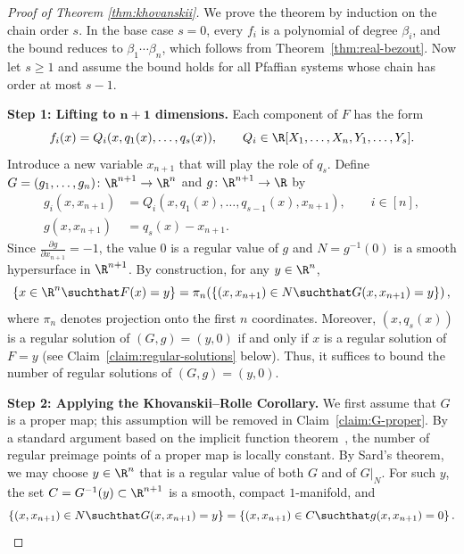 \begin{proof}[Proof of Theorem \ref{thm:khovanskii}]
We prove the theorem by induction on the chain order $s$. In the base case $s=0$, every $f_i$ is a polynomial of degree $\beta_i$, and the bound reduces to $\beta_1 \dotsm \beta_n$, which follows from Theorem~\ref{thm:real-bezout}. Now let $s \ge 1$ and assume the bound holds for all Pfaffian systems whose chain has order at most $s-1$.

\medskip
\noindent\textbf{Step 1: Lifting to $\boldsymbol{n+1}$ dimensions.}
Each component of $F$ has the form
\begin{equation*}
  f_i(x) = Q_i(x, q_1(x), \ldots, q_s(x)), \qquad Q_i \in \R[X_1, \ldots, X_n, Y_1, \ldots, Y_s].
\end{equation*}
Introduce a new variable $x_{n+1}$ that will play the role of $q_s$. Define $G = (g_1, \ldots, g_n)\colon \R^{n+1} \to \R^n$ and $g\colon \R^{n+1} \to \R$ by
\begin{align*}
  g_i(x, x_{n+1}) &= Q_i(x, q_1(x), \ldots, q_{s-1}(x), x_{n+1}), \qquad i \in [n], \\
  g(x, x_{n+1}) &= q_s(x) - x_{n+1}.
\end{align*}
Since $\frac{\partial g}{\partial x_{n+1}} = -1$, the value $0$ is a regular value of $g$ and $N = g^{-1}(0)$ is a smooth hypersurface in $\R^{n+1}$. By construction, for any $y \in \R^n$,
\begin{equation} \label{eqn:counting-in-n+1}
  \left\{x \in \R^n \suchthat F(x) = y\right\} = \pi_n\!\left(\left\{(x, x_{n+1}) \in N \suchthat G(x, x_{n+1}) = y\right\}\right),
\end{equation}
where $\pi_n$ denotes projection onto the first $n$ coordinates. Moreover, $(x, q_s(x))$ is a regular solution of $(G, g) = (y, 0)$ if and only if $x$ is a regular solution of $F = y$ (see Claim~\ref{claim:regular-solutions} below). Thus, it suffices to bound the number of regular solutions of $(G, g) = (y, 0)$.

\medskip
\noindent\textbf{Step 2: Applying the Khovanskii--Rolle Corollary.}
We first assume that $G$ is a proper map; this assumption will be removed in Claim~\ref{claim:G-proper}. By a standard argument based on the implicit function theorem~\cite[Chapter~1]{milnor1997topology}, the number of regular preimage points of a proper map is locally constant. By Sard's theorem, we may choose $y \in \R^n$ that is a regular value of both $G$ and of $G|_N$. For such $y$, the set $C = G^{-1}(y) \subset \R^{n+1}$ is a smooth, compact $1$-manifold, and
\begin{equation*}
  \left\{(x, x_{n+1}) \in N \suchthat G(x, x_{n+1}) = y\right\} = \left\{(x, x_{n+1}) \in C \suchthat g(x, x_{n+1}) = 0\right\}.
\end{equation*}


\end{proof}
